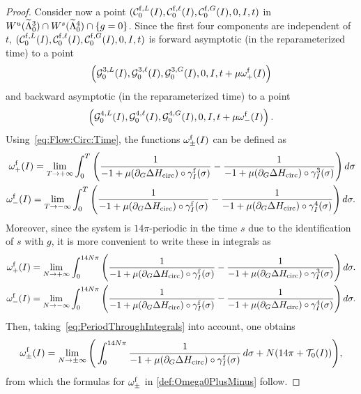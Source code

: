 \begin{proof}
  Consider now a point
  $(\mathcal{C}_0^{\mathrm{f},L}(I),\mathcal{C}_0^{\mathrm{f},\ell}(I),\mathcal{C}_0^{\mathrm{f},G}(I),0,I,t)$ in
  $W^u(\widetilde \Lambda^3_0)\cap W^s(\widetilde \Lambda^4_0)\cap\{g=0\}$. Since the first
  four components are independent of $t$,
  $(\mathcal{C}_0^{\mathrm{f},L}(I),\mathcal{C}_0^{\mathrm{f},\ell}(I),\mathcal{C}_0^{\mathrm{f},G}(I),0,I,t)$ is forward
  asymptotic (in the reparameterized time) to a point
  \[
  \left(\mathcal{G}_0^{3,L}(I),\mathcal{G}_0^{3,\ell}(I),\mathcal{G}_0^{3,G}(I),0,I,t+\mu\omega_+^{\mathrm{f}}(I)\right)
  \]
  and backward asymptotic  (in the reparameterized time) to a
  point \[\left(\mathcal{G}_0^{4,L}(I),\mathcal{G}_0^{4,\ell}(I),
    \mathcal{G}_0^{4,G}(I),0,I,t+\mu\omega_-^{\mathrm{f}}(I)\right).\]
  Using~\eqref{eq:Flow:Circ:Time}, the functions $\omega_\pm^{\mathrm{f}}(I)$ can
  be defined as
  \begin{equation}\label{def:OmegaSmall}
  \begin{split}
    \omega_+^{\mathrm{f}}(I)=\lim_{T\rightarrow+\infty}\int_0^{ T}\Bigg(
    \frac{1}{-1+ \mu (\partial_G\Delta H_{\mathrm{circ}}) \circ \gamma^{\mathrm{f}}_I(\sigma)}
    -\frac{1}{-1+\mu (\partial_G\Delta H_{\mathrm{circ}}) \circ
      \gamma^3_I(\sigma)}\Bigg) \, d\sigma\\
\omega_-^{\mathrm{f}}(I)=\lim_{T\rightarrow-\infty}\int_0^{ T}\Bigg(
    \frac{1}{-1+ \mu (\partial_G\Delta H_{\mathrm{circ}}) \circ \gamma^{\mathrm{f}}_I(\sigma)}
    -\frac{1}{-1+\mu (\partial_G\Delta H_{\mathrm{circ}}) \circ
      \gamma^4_I(\sigma)}\Bigg) \, d\sigma.
\end{split}
\end{equation}
  Moreover, since the system is $14\pi$-periodic in the time $s$ due
  to the identification of $s$ with $g$, it is more convenient to
  write these in integrals as
  \[
\begin{split}
  \omega^{\mathrm{f}}_+(I)=\lim_{N\rightarrow+\infty}\int_0^{ 14N\pi
  }\Bigg(\frac{1}{-1+ \mu (\partial_G\Delta H_{\mathrm{circ}}) \circ
    \gamma^{\mathrm{f}}_I(\sigma)} -\frac{1}{-1+\mu (\partial_G\Delta H_{\mathrm{circ}}) \circ
    \gamma^3_I(\sigma) }\Bigg) \,d\sigma.\\
  \omega^{\mathrm{f}}_-(I)=\lim_{N\rightarrow-\infty}\int_0^{ 14N\pi
  }\Bigg(\frac{1}{-1+ \mu (\partial_G\Delta H_{\mathrm{circ}}) \circ
    \gamma^{\mathrm{f}}_I(\sigma)} -\frac{1}{-1+\mu (\partial_G\Delta H_{\mathrm{circ}}) \circ
    \gamma^4_I(\sigma) }\Bigg) \,d\sigma.
\end{split}
 \]
  Then, taking~\eqref{eq:PeriodThroughIntegrals} into account, one
  obtains
  \[
    \omega_\pm^{\mathrm{f}}(I)=\lim_{N\rightarrow\pm\infty}\Bigg(\int_0^{ 14N\pi }
    \frac{1}{-1+\mu(\partial_G\Delta H_{\mathrm{circ}}) \circ \gamma^{\mathrm{f}}_I(\sigma)}\,
    d\sigma+N(14\pi+\mathcal{T}_0(I))\Bigg),
  \]
  from which the formulas for $\omega_\pm^{\mathrm{f}}$ in \eqref{def:Omega0PlusMinus} follow.


\end{proof}
